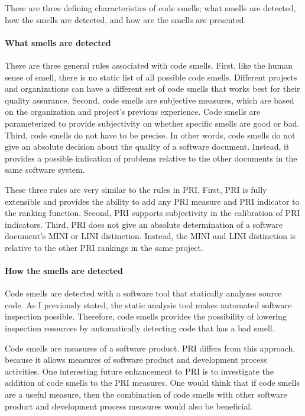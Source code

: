 There are three defining characteristics of code smells; what smells are
detected, how the smells are detected, and how are the smells are
presented.

\paragraph{What smells are detected}
There are three general rules associated with code smells. First, like the
human sense of smell, there is no static list of all possible code smells.
Different projects and organizations can have a different set of code
smells that works best for their quality assurance. Second, code smells are
subjective measures, which are based on the organization and project's
previous experience. Code smells are parameterized to provide subjectivity
on whether specific smells are good or bad. Third, code smells do not have
to be precise. In other words, code smells do not give an absolute
decision about the quality of a software document. Instead, it provides a
possible indication of problems relative to the other documents in the same 
software system. 

These three rules are very similar to the rules in PRI. First, PRI is fully
extensible and provides the ability to add any PRI measure and PRI
indicator to the ranking function. Second, PRI supports subjectivity in the
calibration of PRI indicators. Third, PRI does not give an absolute
determination of a software document's MINI or LINI distinction. Instead,
the MINI and LINI distinction is relative to the other PRI rankings in the
same project.

\paragraph{How the smells are detected}
Code smells are detected with a software tool that statically analyzes
source code. As I previously stated, the static analysis tool makes
automated software inspection possible. Therefore, code smells provides the 
possibility of lowering inspection resources by automatically detecting code 
that has a bad smell. 


Code smells are measures of a software product. PRI differs from this
approach, because it allows measures of software product and development
process activities. One interesting future enhancement to PRI is to
investigate the addition of code smells to the PRI measures. One would
think that if code smells are a useful measure, then the combination of
code smells with other software product and development process measures
would also be beneficial. 

